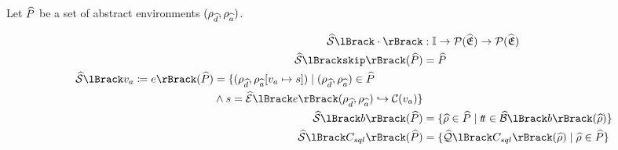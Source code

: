 Let $\widehat{P}$ be a set of abstract environments $(\rho_{\widehat{d}}, \rho_{\widehat{a}})$.

\begin{align} \label{eq:abssemtype}
    \abssem{\cdot} &: \mathbb{I} \rightarrow \mathcal{P}(\ab{\mathfrak{E}}) \rightarrow \mathcal{P}(\ab{\mathfrak{E}}) \\
    \abssem{\texttt{skip}}(\ab{P}) &= \ab{P} \\
    \begin{split}
    \abssem{v_a \coloneqq e}(\ab{P}) &= \{(\env{\ab{d}}, \env{\absvars}[v_a \mapsto s]) \mid (\env{\ab{d}}, \env{\absvars}) \in \ab{P} \\
        & \land s = \absexpsem{e}(\env{\ab{d}}, \env{\absvars}) \into \lookupcl(v_a) \}
    \end{split}\\
    \abssem{b}(\ab{P}) &= \{ \ab{\environment} \in \ab{P} \mid \true \in \absboolsem{b}(\ab{\environment}) \} \\
    \abssem{C_{sql}}(\ab{P}) &= \{\abssqlsem{C_{sql}}(\ab{\environment}) \mid \ab{\environment} \in \ab{P} \}
\end{align}


